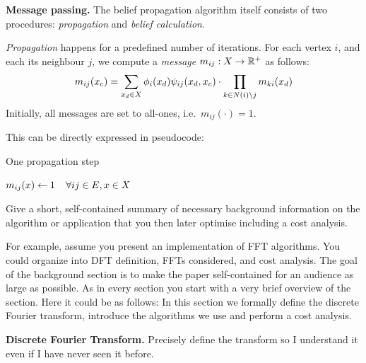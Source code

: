 \documentclass[letterpaper]{article}
\newcommand{\mypar}[1]{{\bf #1.}}
\begin{document}
\mypar{Message passing} The belief propagation algorithm itself consists of two
procedures: \emph{propagation} and \emph{belief calculation}.

\emph{Propagation} happens for a predefined number of iterations. For each vertex $i$, and each its neighbour $j$, we compute a \emph{message} $m_{ij} : X \to \mathbb{R}^+$ as follows:
%
$$m_{ij}(x_c) = \sum_{x_d \in X} \phi_i(x_d)\psi_{ij}(x_d, x_c) \cdot \prod_{k \in N(i) \setminus j} m_{ki}(x_d)$$
%
Initially, all messages are set to all-ones, i.e.~$m_{ij}(\cdot) = 1$.

This can be directly expressed in pseudocode:

\def\lineAlgoPropagateForI{4}
\def\lineAlgoPropagateCalcProduct{9}
\begin{algorithm}
\caption{One propagation step}
\label{algo:propagate}
\algodefaults
	$m_{ij}(x) \leftarrow 1\mkern 20mu\forall ij \in E, x \in X$\;
\end{algorithm}



Give a short, self-contained summary of necessary
background information on the algorithm or application that you then later optimise including a cost analysis.

For example, assume you present an
implementation of FFT algorithms. You could organize into DFT
definition, FFTs considered, and cost analysis. The goal of the
background section is to make the paper self-contained for an audience
as large as possible. As in every section
you start with a very brief overview of the section. Here it could be as follows: In this section
we formally define the discrete Fourier transform, introduce the algorithms we use
and perform a cost analysis.

\mypar{Discrete Fourier Transform}
Precisely define the transform so I understand it even if I have never
seen it before.
\end{document}
